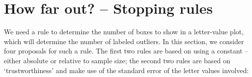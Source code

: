 \documentclass[12pt,oneside]{article}
\begin{document}
\section{How far out? -- Stopping rules}
\label{sec:extent}

We need a rule to determine the number of boxes to show in a letter-value plot, which will determine the number of labeled outliers. In this section, we consider four proposals for such a rule. The first two rules are based on using a constant -- either absolute or relative to sample size; the second two rules are based on `trustworthiness'  and make use of the standard error of the letter values involved:
\end{document}
